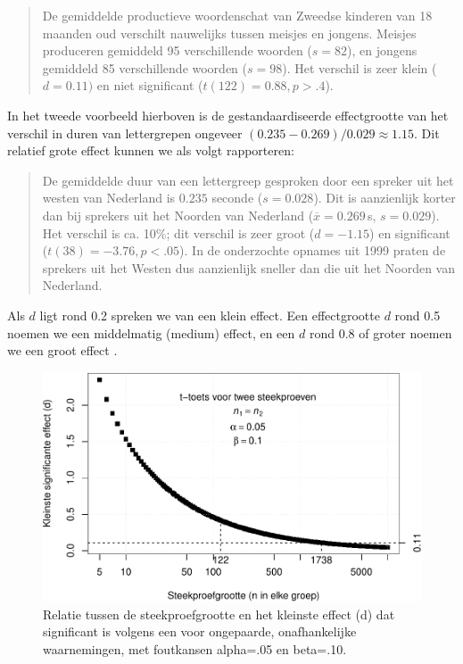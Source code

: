 \documentclass[
]{book}
\begin{document}
\begin{quote}
De gemiddelde productieve woordenschat van Zweedse kinderen van 18
maanden oud verschilt nauwelijks tussen meisjes en jongens. Meisjes
produceren gemiddeld 95 verschillende woorden (\(s=82\)), en jongens
gemiddeld 85 verschillende woorden (\(s=98\)). Het verschil is zeer
klein (\(d=0.11)\) en niet significant (\(t(122)=0.88, p>.4\)).
\end{quote}

In het tweede voorbeeld hierboven is de gestandaardiseerde effectgrootte
van het verschil in duren van lettergrepen ongeveer
\((0.235-0.269)/0.029 \approx 1.15\). Dit relatief grote effect kunnen we
als volgt rapporteren:

\begin{quote}
De gemiddelde duur van een lettergreep gesproken door een spreker uit
het westen van Nederland is \(0.235\) seconde (\(s=0.028\)). Dit is
aanzienlijk korter dan bij sprekers uit het Noorden van Nederland
(\(\overline{x}=0.269\) s, \(s=0.029\)). Het verschil is ca. 10\%; dit
verschil is zeer groot (\(d=-1.15\)) en significant
(\(t(38)=-3.76, p<.05\)). In de onderzochte opnames uit 1999 praten de
sprekers uit het Westen dus aanzienlijk sneller dan die uit het
Noorden van Nederland.
\end{quote}

Als \(d\) ligt rond 0.2 spreken we van een klein effect. Een effectgrootte
\(d\) rond 0.5 noemen we een middelmatig (medium) effect, en een \(d\) rond
0.8 of groter noemen we een groot effect \citep{Cohen88, Rose08}.

\begin{figure}
\centering
\includegraphics{KMS-NL_files/figure-latex/kleinstesignifverschil-1.pdf}
\caption{\label{fig:kleinstesignifverschil}Relatie tussen de steekproefgrootte en het kleinste effect (d) dat significant is volgens een voor ongepaarde, onafhankelijke waarnemingen, met foutkansen alpha=.05 en beta=.10.}
\end{figure}
\end{document}
